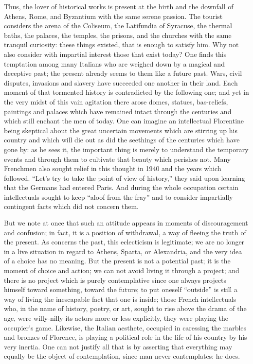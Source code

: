 \documentclass[11pt]{article}
\begin{document}
{{Thus, the lover of historical works is present at the birth and the downfall of Athens, Rome, and Byzantium with the same serene passion. The tourist considers the arena of the Coliseum, the Latifundia of Syracuse, the thermal baths, the palaces, the temples, the prisons, and the churches with the same tranquil curiosity: these things existed, that is enough to satisfy him. Why not also consider with impartial interest those that exist today? One finds this temptation among many Italians who are weighed down by a magical and deceptive past; the present already seems to them like a future past. Wars, civil disputes, invasions and slavery have succeeded one another in their land. Each moment of that tormented history is contradicted by the following one; and yet in the very midst of this vain agitation there arose domes, statues, bas-reliefs, paintings and palaces which have remained intact through the centuries and which still enchant the men of today. One can imagine an intellectual Florentine being skeptical about the great uncertain movements which are stirring up his country and which will die out as did the seethings of the centuries which have gone by: as he sees it, the important thing is merely to understand the temporary events and through them to cultivate that beauty which perishes not. Many Frenchmen also sought relief in this thought in 1940 and the years which followed. “Let’s try to take the point of view of history,” they said upon learning that the Germans had entered Paris. And during the whole occupation certain intellectuals sought to keep “aloof from the fray” and to consider impartially contingent facts which did not concern them.

But we note at once that such an attitude appears in moments of discouragement and confusion; in fact, it is a position of withdrawal, a way of fleeing the truth of the present. As concerns the past, this eclecticism is legitimate; we are no longer in a live situation in regard to Athens, Sparta, or Alexandria, and the very idea of a choice has no meaning. But the present is not a potential past; it is the moment of choice and action; we can not avoid living it through a project; and there is no project which is purely contemplative since one always projects himself toward something, toward the future; to put oneself “outside” is still a way of living the inescapable fact that one is inside; those French intellectuals who, in the name of history, poetry, or art, sought to rise above the drama of the age, were willy-nilly its actors more or less explicitly, they were playing the occupier’s game. Likewise, the Italian aesthete, occupied in caressing the marbles and bronzes of Florence, is playing a political role in the life of his country by his very inertia. One can not justify all that is by asserting that everything may equally be the object of contemplation, since man never contemplates: he does.

}}
\end{document}
